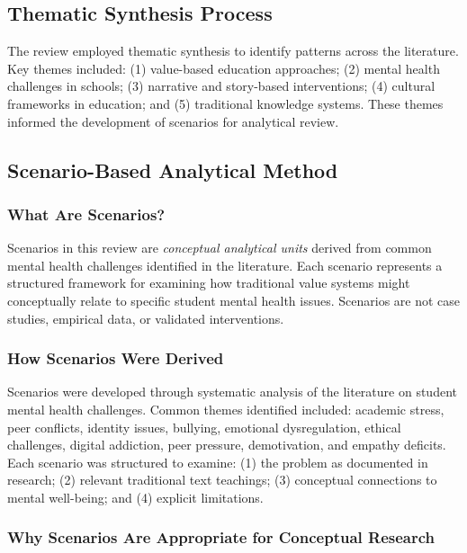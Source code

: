\documentclass[12pt,a4paper,twocolumn]{article}
\begin{document}
\subsection{Thematic Synthesis Process}

The review employed thematic synthesis to identify patterns across the literature. Key themes included: (1) value-based education approaches; (2) mental health challenges in schools; (3) narrative and story-based interventions; (4) cultural frameworks in education; and (5) traditional knowledge systems. These themes informed the development of scenarios for analytical review.

\subsection{Scenario-Based Analytical Method}

\subsubsection{What Are Scenarios?}

Scenarios in this review are \textit{conceptual analytical units} derived from common mental health challenges identified in the literature. Each scenario represents a structured framework for examining how traditional value systems might conceptually relate to specific student mental health issues. Scenarios are not case studies, empirical data, or validated interventions.

\subsubsection{How Scenarios Were Derived}

Scenarios were developed through systematic analysis of the literature on student mental health challenges. Common themes identified included: academic stress, peer conflicts, identity issues, bullying, emotional dysregulation, ethical challenges, digital addiction, peer pressure, demotivation, and empathy deficits. Each scenario was structured to examine: (1) the problem as documented in research; (2) relevant traditional text teachings; (3) conceptual connections to mental well-being; and (4) explicit limitations.

\subsubsection{Why Scenarios Are Appropriate for Conceptual Research}
\end{document}
